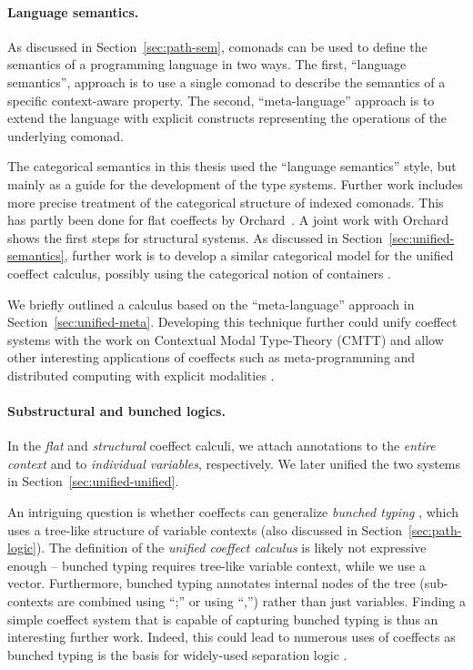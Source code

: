 \paragraph{Language semantics.}

As discussed in Section~\ref{sec:path-sem}, comonads can be used to define the semantics of a
programming language in two ways. The first, ``language semantics'', approach is to use a 
single comonad to describe the semantics of a specific context-aware property. The second,
``meta-language'' approach is to extend the language with explicit constructs representing the 
operations of the underlying comonad.

The categorical semantics in this thesis used the ``language semantics'' style, but mainly as a
guide for the development of the type systems. Further work includes more precise treatment of
the categorical structure of indexed comonads. This has partly been done for flat coeffects by
Orchard~\cite{comonads-dom-thesis}. A joint work with Orchard~\cite{coeffects-icfp14} shows the
first steps for structural systems. As discussed in Section~\ref{sec:unified-semantics}, further
work is to develop a similar categorical model for the unified coeffect calculus, possibly using
the categorical notion of containers \cite{types-containers}.

We briefly outlined a calculus based on the ``meta-language'' approach in Section~\ref{sec:unified-meta}.
Developing this technique further could unify coeffect systems with the work on Contextual Modal
Type-Theory (CMTT) \cite{logic-cmtt} and allow other interesting applications of coeffects such
as meta-programming \cite{logic-cmtt} and distributed computing with explicit modalities \cite{app-distributed-ml5}.


\paragraph{Substructural and bunched logics.}

In the \emph{flat} and \emph{structural} coeffect calculi, we attach annotations to the \emph{entire
context} and to \emph{individual variables}, respectively. We later unified the two systems 
in Section~\ref{sec:unified-unified}.

An intriguing question is whether coeffects can generalize \emph{bunched typing} \cite{substruct-bunched},
which uses a tree-like structure of variable contexts (also discussed in Section~\ref{sec:path-logic}).
The definition of the \emph{unified coeffect calculus} is likely not expressive enough -- bunched
typing requires tree-like variable context, while we use a vector. Furthermore, bunched typing
annotates internal nodes of the tree (sub-contexts are combined using ``;'' or using ``,'') rather 
than just variables. Finding a simple coeffect system that is capable of capturing bunched typing
is thus an interesting further work. Indeed, this could lead to numerous uses of coeffects as 
bunched typing is the basis for widely-used separation logic \cite{substruct-separation-logic}.

